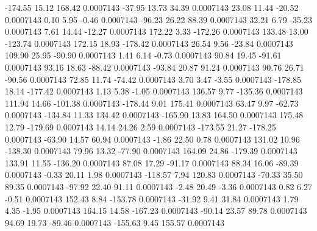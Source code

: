      -174.55       15.12      168.42     0.0007143
      -37.95       13.73       34.39     0.0007143
       23.08       11.44      -20.52     0.0007143
        0.10        5.95       -0.46     0.0007143
      -96.23       26.22       88.39     0.0007143
       32.21        6.79      -35.23     0.0007143
        7.61       14.44      -12.27     0.0007143
      172.22        3.33     -172.26     0.0007143
      133.48       13.00     -123.74     0.0007143
      172.15       18.93     -178.42     0.0007143
       26.54        9.56      -23.84     0.0007143
      109.90       25.95      -90.90     0.0007143
        1.41        6.14       -0.73     0.0007143
       90.84       19.45      -91.61     0.0007143
       93.16       18.63      -88.42     0.0007143
      -93.84       20.87       91.24     0.0007143
       90.76       26.71      -90.56     0.0007143
       72.85       11.74      -74.42     0.0007143
        3.70        3.47       -3.55     0.0007143
     -178.85       18.14     -177.42     0.0007143
        1.13        5.38       -1.05     0.0007143
      136.57        9.77     -135.36     0.0007143
      111.94       14.66     -101.38     0.0007143
     -178.44        9.01      175.41     0.0007143
       63.47        9.97      -62.73     0.0007143
     -134.84       11.33      134.42     0.0007143
     -165.90       13.83      164.50     0.0007143
      175.48       12.79     -179.69     0.0007143
       14.14       24.26        2.59     0.0007143
     -173.55       21.27     -178.25     0.0007143
      -63.90       14.57       60.94     0.0007143
       -1.86       22.50        0.78     0.0007143
      131.02       10.96     -138.30     0.0007143
       79.96       13.32      -77.90     0.0007143
      164.09       24.86     -179.39     0.0007143
      133.91       11.55     -136.20     0.0007143
       87.08       17.29      -91.17     0.0007143
       88.34       16.06      -89.39     0.0007143
       -0.33       20.11        1.98     0.0007143
     -118.57        7.94      120.83     0.0007143
      -70.33       35.50       89.35     0.0007143
      -97.92       22.40       91.11     0.0007143
       -2.48       20.49       -3.36     0.0007143
        0.82        6.27       -0.51     0.0007143
      152.43        8.84     -153.78     0.0007143
      -31.92        9.41       31.84     0.0007143
        1.79        4.35       -1.95     0.0007143
      164.15       14.58     -167.23     0.0007143
      -90.14       23.57       89.78     0.0007143
       94.69       19.73      -89.46     0.0007143
     -155.63        9.45      155.57     0.0007143
